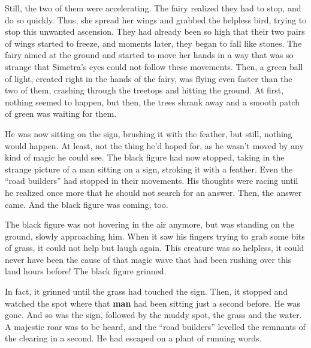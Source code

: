 Still, the two of them were accelerating. The fairy realized they had to stop, and do so quickly. Thus, she spread her wings and grabbed the helpless bird, trying to stop this unwanted ascension. They had already been so high that their two pairs of wings started to freeze, and moments later, they began to fall like stones. The fairy aimed at the ground and started to move her hands in a way that was so strange that Simetra's eyes could not follow these movements. Then, a green ball of light, created right in the hands of the fairy, was flying even faster than the two of them, crashing through the treetops and hitting the ground. At first, nothing seemed to happen, but then, the trees shrank away and a smooth patch of green was waiting for them. 

\froufrou{}

He was now sitting on the sign, brushing it with the feather, but still, nothing would happen. At least, not the thing he'd hoped for, as he wasn't moved by any kind of magic he could see. The black figure had now stopped, taking in the strange picture of a man sitting on a sign, stroking it with a feather. Even the \enquote{road builders} had stopped in their movements.
His thoughts were racing until he realized once more that he should not search for an answer. Then, the answer came. And the black figure was coming, too.

\froufrou{}

The black figure was not hovering in the air anymore, but was standing on the ground, slowly approaching him. When it saw his fingers trying to grab some bits of grass, it could not help but laugh again. This creature was so helpless, it could never have been the cause of that magic wave that had been rushing over this land hours before! 
The black figure grinned.

In fact, it grinned until the grass had touched the sign. Then, it stopped and watched the spot where that \textbf{man} had been sitting just a second before. 
He was gone. 
And so was the sign, followed by the muddy spot, the grass and the water. A majestic roar was to be heard, and the \enquote{road builders} levelled the remnants of the clearing in a second.
He had escaped on a plant of running words.
